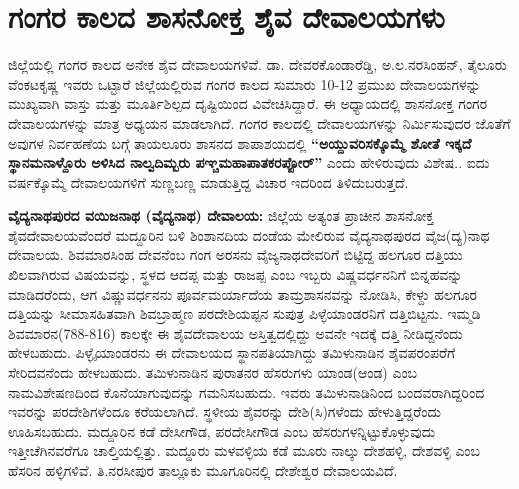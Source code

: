 \section*{ಗಂಗರ ಕಾಲದ ಶಾಸನೋಕ್ತ ಶೈವ ದೇವಾಲಯಗಳು}

ಜಿಲ್ಲೆಯಲ್ಲಿ ಗಂಗರ ಕಾಲದ ಅನೇಕ ಶೈವ ದೇವಾಲಯಗಳಿವೆ. ಡಾ. ದೇವರಕೊಂಡಾರೆಡ್ಡಿ, ಅ.ಲ.ನರಸಿಂಹನ್​, ತೈಲೂರು ವೆಂಕಟಕೃಷ್ಣ ಇವರು ಒಟ್ಟಾರೆ ಜಿಲ್ಲೆಯಲ್ಲಿರುವ ಗಂಗರ ಕಾಲದ ಸುಮಾರು 10-12 ಪ್ರಮುಖ ದೇವಾಲಯಗಳನ್ನು ಮುಖ್ಯವಾಗಿ ವಾಸ್ತು ಮತ್ತು ಮೂರ್ತಿಶಿಲ್ಪದ ದೃಷ್ಟಿಯಿಂದ ವಿವೇಚಿಸಿದ್ದಾರೆ. ಈ ಅಧ್ಯಾಯದಲ್ಲಿ ಶಾಸನೋಕ್ತ ಗಂಗರ ದೇವಾಲಯಗಳನ್ನು ಮಾತ್ರ ಅಧ್ಯಯನ ಮಾಡಲಾಗಿದೆ. ಗಂಗರ ಕಾಲದಲ್ಲಿ ದೇವಾಲಯಗಳನ್ನು ನಿರ್ಮಿಸುವುದರ ಜೊತೆಗೆ ಅವುಗಳ ನಿರ್ವಹಣೆಯ ಬಗ್ಗೆ ತಾಯಲೂರು ಶಾಸನದ ಶಾಪಾಶಯದಲ್ಲಿ \textbf{“ಅಯ್ದುವರಿಸಕ್ಕೊಮ್ಮೆ ಶೋತೆ ಇಕ್ಕದೆ ಸ್ಥಾನಮನಾಳ್ದೊರು ಅಳಿಸಿದ ನಾಲ್ವದಿಮ್ಬರು ಪಞ್ಚಮಹಾಪಾತಕರಪ್ಪೋರ್​”} ಎಂದು ಹೇಳಿರುವುದು ವಿಶೇಷ.. ಐದು ವರ್ಷಕ್ಕೊಮ್ಮೆ ದೇವಾಲಯಗಳಿಗೆ ಸುಣ್ಣಬಣ್ಣ ಮಾಡುತ್ತಿದ್ದ ವಿಚಾರ ಇದರಿಂದ ತಿಳಿದುಬರುತ್ತದೆ.

\textbf{ವೈದ್ಯನಾಥಪುರದ ವಯಿಜನಾಥ (ವೈದ್ಯನಾಥ) ದೇವಾಲಯ: } ಜಿಲ್ಲೆಯ ಅತ್ಯಂತ ಪ್ರಾಚೀನ ಶಾಸನೋಕ್ತ ಶೈವ\-ದೇವಾ\-ಲಯವೆಂದರೆ ಮದ್ದೂರಿನ ಬಳಿ ಶಿಂಶಾನದಿಯ ದಂಡೆಯ ಮೇಲಿರುವ ವೈದ್ಯನಾಥಪುರದ ವೈಜ(ದ್ಯ)ನಾಥ ದೇವಾಲಯ. ಶಿವಮಾರಸಿಂಹ ದೇವನೆಂಬ ಗಂಗ ಅರಸನು ವೈಜ್ಯನಾಥದೇವರಿಗೆ ಬಿಟ್ಟಿದ್ದ ಹಲಗೂರ ದತ್ತಿಯು ಖಿಲವಾಗಿರುವ ವಿಷಯವನ್ನು, ಸ್ಥಳದ ಆದಪ್ಪ ಮತ್ತು ರಾಜಪ್ಪ ಎಂಬ ಇಬ್ಬರು ವಿಷ್ಣವರ್ಧನನಿಗೆ ಬಿನ್ನಹವನ್ನು ಮಾಡಿದರೆಂದು, ಆಗ ವಿಷ್ಣುವರ್ಧನನು ಪೂರ್ವಮರ್ಯಾದೆಯ ತಾಮ್ರಶಾಸನವನ್ನು ನೋಡಿಸಿ, ಕೇಳ್ದು ಹಲಗೂರ ದತ್ತಿಯನ್ನು ಸೀಮಾಸಹಿತವಾಗಿ ಶಿವಬ್ರಾಹ್ಮಣ ಪರದೇಶಿಯಪ್ಪನ ಸುಪುತ್ರ ಪಿಳ್ಳೆಯಾಂಡರನಿಗೆ ದತ್ತಿಬಿಟ್ಟನು. ಇಮ್ಮಡಿ ಶಿವಮಾರನ(788-816) ಕಾಲಕ್ಕೇ ಈ ಶೈವದೇವಾಲಯ ಅಸ್ತಿತ್ವದಲ್ಲಿದ್ದು ಅವನೇ ಇದಕ್ಕೆ ದತ್ತಿ ನೀಡಿದ್ದನೆಂದು ಹೇಳಬಹುದು. ಪಿಳ್ಳೈಯಾಂಡರನು ಈ ದೇವಾಲಯದ ಸ್ಥಾನಪತಿ\-ಯಾಗಿದ್ದು ತಮಿಳುನಾಡಿನ ಶೈವಪರಂಪರೆಗೆ ಸೇರಿದವನೆಂದು ಹೇಳಬಹುದು. ತಮಿಳುನಾಡಿನ ಪುರಾತನರ ಹೆಸರುಗಳು ಯಾಂಡ(ಆಂಡ) ಎಂಬ ನಾಮವಿಶೇಷಣದಿಂದ ಕೊನೆಯಾಗುವುದನ್ನು ಗಮನಿಸಬಹುದು. ಇವರು ತಮಿಳುನಾಡಿನಿಂದ ಬಂದವರಾಗಿದ್ದರಿಂದ ಇವರನ್ನು ಪರದೇಶಿಗಳೆಂದೂ ಕರೆಯಲಾಗಿದೆ. ಸ್ಥಳೀಯ ಶೈವರನ್ನು ದೇಶಿ(ಸಿ)ಗಳೆಂದು ಹೇಳುತ್ತಿದ್ದರೆಂದು ಊಹಿಸಬಹುದು. ಮದ್ದೂರಿನ ಕಡೆ ದೇಸೀಗೌಡ, ಪರದೇಸೀಗೌಡ ಎಂಬ ಹೆಸರುಗಳನ್ನಿಟ್ಟುಕೊಳ್ಳುವುದು ಇತ್ತೀಚೆಗಿನವರೆಗೂ ಚಾಲ್ತಿಯಲ್ಲಿತ್ತು. ಮದ್ದೂರು ಮಳವಳ್ಳಿಯ ಕಡೆ ಮೂರು ನಾಲ್ಕು ದೇಶಹಳ್ಳಿ, ದೇಶವಳ್ಳಿ ಎಂಬ ಹೆಸರಿನ ಹಳ್ಳಿಗಳಿವೆ. ತಿ.ನರಸೀಪುರ ತಾಲ್ಲೂಕು ಮೂಗೂರಿನಲ್ಲಿ ದೇಶೇಶ್ವರ ದೇವಾಲಯವಿದೆ.

